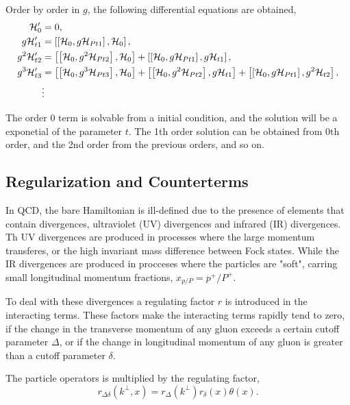 \documentclass[11pt,a4paper,twoside,pdf]{article}
\numberwithin{equation}{section}
\begin{document}
Order by order in $g$, the following differential equations are obtained,
\begin{align}
        \mathcal{H}_{0}^\prime &= 0, \label{eq:diff_order0}\\
        g\mathcal{H}_{t 1}^\prime &= \left[ \left[ \mathcal{H}_0, g\mathcal{H}_{Pt 1} \right], 
        \mathcal{H}_{0} \right], \label{eq:diff_order1}\\
        g^2\mathcal{H}_{t 2}^\prime &= \left[ \left[ \mathcal{H}_0, g^2\mathcal{H}_{Pt 2} \right], 
        \mathcal{H}_{0} \right] + \left[ \left[ \mathcal{H}_0, g\mathcal{H}_{Pt 1} \right], 
        g\mathcal{H}_{t 1} \right], \\
        g^3\mathcal{H}_{t 3}^\prime &= \left[ \left[ \mathcal{H}_0, g^3\mathcal{H}_{Pt 3} \right], 
        \mathcal{H}_{0} \right] + \left[ \left[ \mathcal{H}_0, g^2\mathcal{H}_{Pt 2} \right], 
        g\mathcal{H}_{t 1} \right] + \left[ \left[ \mathcal{H}_0, g\mathcal{H}_{Pt 1} \right], 
        g^2\mathcal{H}_{t 2} \right]. \label{eq:diff_order3}\\
        &\vdots \nonumber
\end{align}

The order 0 term is solvable from a initial condition, and the solution will be a 
exponetial of the parameter $t$. The 1th order solution can be obtained from 0th 
order, and the 2nd order from the previous orders, and so on. 

\subsection{Regularization and Counterterms}

In QCD, the bare Hamiltonian is ill-defined due to the presence of elements 
that contain divergences, ultraviolet (UV) divergences and infrared (IR) divergences.
Th UV divergences are produced in processes where the large momentum transferes, 
or the high invariant mass difference between Fock states. While the IR divergences
are produced in procceses where the particles are "soft", carring small longitudinal
momentum fractions, $x_{p/P} = p^+/P^+$.

To deal with these divergences a regulating factor $r$ is 
introduced in the interacting terms. These factors make the interacting terms rapidly 
tend to zero, if the change in the transverse momentum of any gluon exceeds a certain
cutoff parameter $\Delta$, or if the change in longitudinal momentum of any gluon is
greater than a cutoff parameter $\delta$. 

The particle operators is multiplied by the regulating factor, 
\begin{equation}
    r_{\Delta \delta} (k^\perp, x) = r_\Delta (k^\perp) r_\delta(x) \theta(x).
\end{equation}
\end{document}
